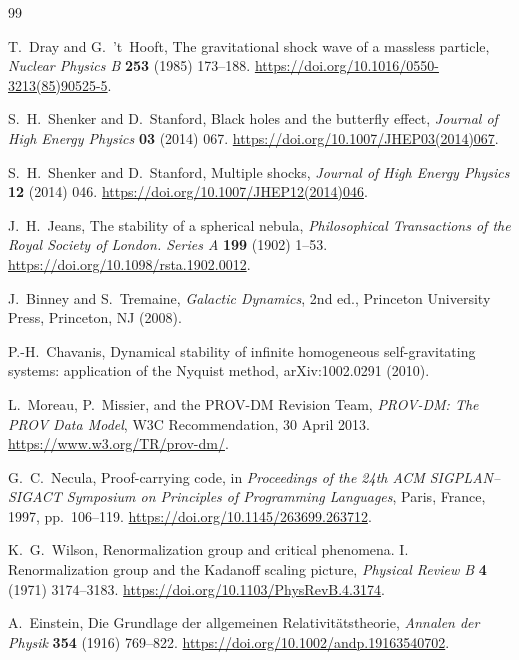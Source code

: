 \documentclass[11pt]{article}
\theoremstyle{definition}
\begin{document}
\begin{thebibliography}{99}

T.~Dray and G.~'t~Hooft, The gravitational shock wave of a massless particle,
\emph{Nuclear Physics B} \textbf{253} (1985) 173--188.
\url{https://doi.org/10.1016/0550-3213(85)90525-5}.

S.~H.~Shenker and D.~Stanford, Black holes and the butterfly effect,
\emph{Journal of High Energy Physics} \textbf{03} (2014) 067.
\url{https://doi.org/10.1007/JHEP03(2014)067}.

S.~H.~Shenker and D.~Stanford, Multiple shocks,
\emph{Journal of High Energy Physics} \textbf{12} (2014) 046.
\url{https://doi.org/10.1007/JHEP12(2014)046}.

J.~H.~Jeans, The stability of a spherical nebula,
\emph{Philosophical Transactions of the Royal Society of London. Series A}
\textbf{199} (1902) 1--53.
\url{https://doi.org/10.1098/rsta.1902.0012}.

J.~Binney and S.~Tremaine, \emph{Galactic Dynamics}, 2nd ed.,
Princeton University Press, Princeton, NJ (2008).

P.-H.~Chavanis, Dynamical stability of infinite homogeneous
self-gravitating systems: application of the Nyquist method,
arXiv:1002.0291 (2010).



L.~Moreau, P.~Missier, and the PROV-DM Revision Team, \emph{PROV-DM: The PROV
Data Model}, W3C Recommendation, 30 April 2013.
\url{https://www.w3.org/TR/prov-dm/}.

G.~C.~Necula, Proof-carrying code, in \emph{Proceedings of the 24th ACM
SIGPLAN--SIGACT Symposium on Principles of Programming Languages}, Paris,
France, 1997, pp.~106--119.
\url{https://doi.org/10.1145/263699.263712}.

K.~G.~Wilson, Renormalization group and critical phenomena. I. Renormalization
group and the Kadanoff scaling picture, \emph{Physical Review B} \textbf{4}
(1971) 3174--3183.
\url{https://doi.org/10.1103/PhysRevB.4.3174}.

A.~Einstein, Die Grundlage der allgemeinen Relativit\"atstheorie,
\emph{Annalen der Physik} \textbf{354} (1916) 769--822.
\url{https://doi.org/10.1002/andp.19163540702}.


\end{thebibliography}
\end{document}
